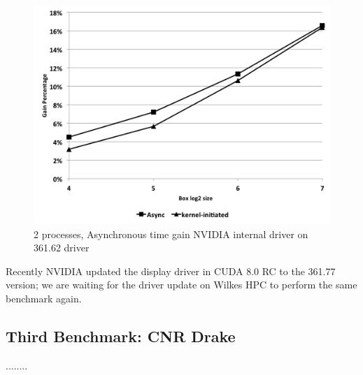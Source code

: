 \documentclass[conference]{IEEEtran}
\begin{document}
\begin{figure}[h]
\includegraphics[scale=0.4]{gain_driver.png}
\caption{2 processes, Asynchronous time gain NVIDIA internal driver on 361.62 driver}
\label{fig:gain_driver}
\end{figure}

Recently NVIDIA updated the display driver in CUDA 8.0 RC to the 361.77 version; we are waiting for the driver update on Wilkes HPC to perform the same benchmark again.


\subsection{Third Benchmark: CNR Drake}

........

%
%
\end{document}
